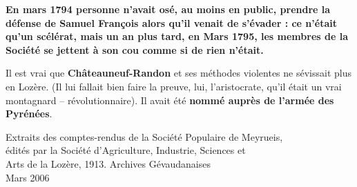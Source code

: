 \textbf{En mars 1794 personne n’avait osé, au moins en public, prendre la défense de Samuel
François alors qu’il venait de s’évader : ce n’était qu’un scélérat, mais un an plus tard,
en Mars 1795, les membres de la Société se jettent à son cou comme si de rien n’était.}

Il est vrai que \textbf{Châteauneuf-Randon} et ses méthodes violentes
ne sévissait plus en Lozère. (Il lui fallait bien faire la preuve, lui, l’aristocrate, qu’il était un
vrai montagnard -- révolutionnaire). Il avait été \textbf{nommé auprès de l’armée des Pyrénées}.

\vspace{5mm}

\begin{center}
\small
Extraits des comptes-rendus de la Société Populaire de Meyrueis,\\
édités par la Société d’Agriculture, Industrie, Sciences et\\
Arts de la Lozère, 1913. Archives Gévaudanaises\\
Mars 2006
\end{center}

